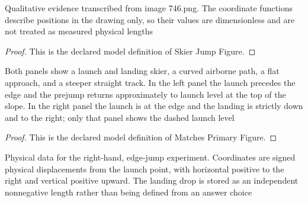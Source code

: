 \begin{definition}
  \label{def:physics:phyx-mini-0746:phyxminiproblems-problemphyxmini0746-skierjumpfigure}
  Qualitative evidence transcribed from image 746.png. The coordinate functions describe positions in the drawing only, so their values are dimensionless and are not treated as measured physical lengths
\end{definition}
\begin{proof}
  This is the declared model definition of Skier Jump Figure.
\end{proof}
\begin{definition}
  \label{def:physics:phyx-mini-0746:phyxminiproblems-problemphyxmini0746-matchesprimaryfigure}
  Both panels show a launch and landing skier, a curved airborne path, a flat approach, and a steeper straight track. In the left panel the launch precedes the edge and the prejump returns approximately to launch level at the top of the slope. In the right panel the launch is at the edge and the landing is strictly down and to the right; only that panel shows the dashed launch level
\end{definition}
\begin{proof}
  This is the declared model definition of Matches Primary Figure.
\end{proof}
\begin{definition}
  \label{def:physics:phyx-mini-0746:phyxminiproblems-problemphyxmini0746-skierslopejumpsetup}
  Physical data for the right-hand, edge-jump experiment. Coordinates are signed physical displacements from the launch point, with horizontal positive to the right and vertical positive upward. The landing drop is stored as an independent nonnegative length rather than being defined from an answer choice
\end{definition}
